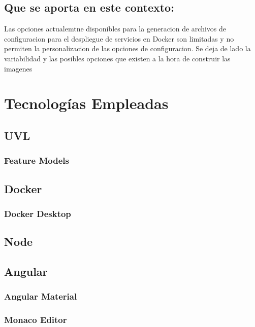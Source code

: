\documentclass[12pt, a4paper, twoside]{article}
\begin{document}
\subsection{Que se aporta en este contexto:}
Las opciones actualemtne disponibles para la generacion de archivos de configuracion para el despliegue de servicios en Docker son limitadas y no permiten la personalizacion de las opciones de configuracion.
Se deja de lado la variabilidad y las posibles opciones que existen a la hora de construir las imagenes 
















\section{Tecnologías Empleadas}

\subsection{UVL}
\subsubsection{Feature Models}

\subsection{Docker}
\subsubsection{Docker Desktop}

\subsection{Node}
\subsection{Angular}
\subsubsection{Angular Material}
\subsubsection{Monaco Editor}
\end{document}
